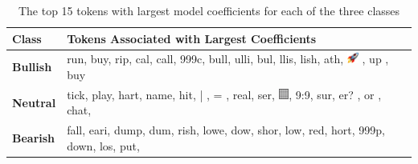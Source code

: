 \begin{table}[!ht]
	\centering

	\begin{tabular}{ll}
\toprule
\textbf{Class} & \textbf{Tokens Associated with Largest Coefficients}\\
\midrule
\textbf{Bullish} & run, buy,  rip,  cal, call, 999c, bull, ulli,  bul, llis, lish,  ath,  \includegraphics[height=1em]{assets/images/emoji_rocket.png} ,  up ,  buy \\
\textbf{Neutral} & tick, play, hart, name,  hit,  | ,  = , real,  ser, \includegraphics[height=0.9em]{assets/images/unicode_lightshade.png},  9:9,  sur, er? ,  or , chat, \\
\textbf{Bearish} &fall, eari, dump,  dum, rish, lowe,  dow, shor,  low,  red, hort, 999p, down,  los,  put, \\
\bottomrule
	\end{tabular}
	\caption{The top 15 tokens with largest model coefficients for each of the three classes}
	\label{table-top-tokens-per-class}
\end{table}